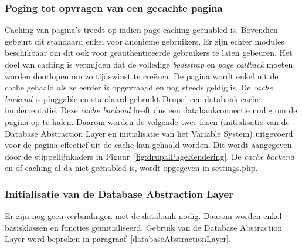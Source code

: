 \subsubsection{Poging tot opvragen van een gecachte pagina}
Caching van pagina's treedt op indien page caching ge\"{e}nabled is. Bovendien gebeurt dit standaard enkel voor anonieme gebruikers. Er zijn echter modules beschikbaar om dit ook voor geauthenticeerde gebruikers te laten gebeuren. Het doel van caching is vermijden dat de volledige \textit{bootstrap} en \textit{page callback} moeten worden doorlopen om zo tijdswinst te cre\"{e}ren. De pagina  wordt enkel uit de cache gehaald als ze eerder is opgevraagd en nog steeds geldig is. De \textit{cache backend} is pluggable en standaard gebruikt Drupal een databank cache implementatie. Deze \textit{cache backend} heeft dus een databankconnectie nodig om de pagina op te halen. Daarom worden de volgende twee fasen (initialisatie van de Database Abstraction Layer en initialisatie van het Variable System) uitgevoerd voor de pagina effectief uit de cache kan gehaald worden. Dit wordt aangegeven door de stippellijnkaders in Figuur~\ref{fig:drupalPageRendering}. De \textit{cache backend} en of caching al da niet ge\"{e}nabled is, wordt opgegeven in settings.php.

\subsubsection{Initialisatie van de Database Abstraction Layer}
Er zijn nog geen verbindingen met de databank nodig. Daarom worden enkel basisklassen en functies ge\"{i}nitialiseerd. Gebruik van de Database Abstraction Layer werd beproken in paragraaf~\ref{databaseAbstractionLayer}.

